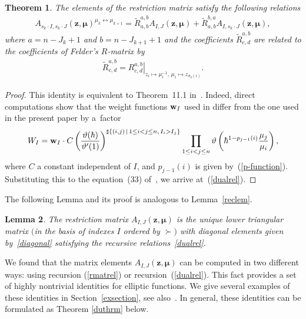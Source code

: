 \documentclass[pdftex]{sigma}
\def\zz{{\boldsymbol z}}
\def\mub{{\boldsymbol\mu}}
\let\thi\vartheta
\numberwithin{equation}{section}
\newtheorem{Theorem}{Theorem}[section]
\newtheorem{Lemma}[Theorem]{Lemma}
\begin{document}
\begin{Theorem} \label{duthm}The elements of the restriction matrix satisfy the following relations
\begin{gather} \label{dualrel}
A_{s_k \cdot I, s_k \cdot J} (\zz, \mub)^{\mu_k\leftrightarrow \mu_{k+1}}=\tilde{R}^{a,b}_{a,b} A_{I,J}(\zz,\mub) + \tilde{R}^{b,a}_{a,b} A_{I,s_k \cdot J}(\zz,\mub),
\end{gather}
where $a=n-J_k+1$ and $b=n-J_{k+1}+1$ and the coefficients $\tilde{R}^{a,b}_{c,d}$ are related to the coefficients of Felder's $R$-matrix by
\begin{gather} \label{dualR}
\tilde{R}^{a,b}_{c,d}=\left.{R}^{a,b}_{c,d}\right|_{z_i \mapsto \mu_i^{-1} ,\, \mu_i \mapsto z_{\sigma_{0}(i)}}.
\end{gather}
\end{Theorem}
\begin{proof}This identity is equivalent to Theorem~11.1 in~\cite{RW}. Indeed, direct computations show that the weight functions
${\bf w}_{I}$ used in \cite{RW} differ from the one used in the present paper by a~factor
\begin{gather*}
W_I = {\bf w}_{I} \cdot C \left( \dfrac{\thi (\hbar)}{\thi' (1)} \right)^{\sharp \{ (i,j) \,|\, 1\leq i<j\leq n, \, I_i > I_j \} } \prod_{1\leq i<j\leq n} \thi \left( \hbar^{1- p_{j-1} (i)} \dfrac{\mu_j}{\mu_i} \right) ,
\end{gather*}
where $C$ a constant independent of $I$, and $p_{j-1} (i)$ is given by~(\ref{p-function}). Substituting this to the equation~(33) of~\cite{RW}, we arrive at~(\ref{dualrel}).
\end{proof}

The following Lemma and its proof is analogous to Lemma~\ref{reclem}.
\begin{Lemma} \label{dulem} The restriction matrix $A_{I,J}(\zz,\mub)$ is the unique lower triangular matrix $($in the basis of indexes $I$ ordered by $\succ)$ with diagonal elements given by~\eqref{diagonal} satisfying the recursive relations~\eqref{dualrel}.
\end{Lemma}

\begin{Note} We found that the matrix elements $A_{I,J}(\zz,\mub)$ can be computed in two different ways: using recursion (\ref{rmatrel}) or recursion~(\ref{dualrel}). This fact provides a set of highly nontrivial identities for elliptic functions. We give several examples of these identities in Section~\ref{exsection}, see also~\cite[Section 9]{RW}. In general, these identities can be formulated as Theorem \ref{duthrm} below.
\end{Note}
\end{document}
